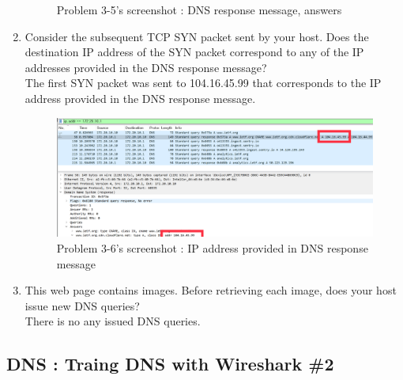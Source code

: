 \begin{enumerate}[label=\bfseries Problem \arabic*:,leftmargin=*,labelindent=1em]
\begin{figure}[!h]
        		\caption{\footnotesize Problem 3-5's screenshot : DNS response message, answers}
        		\vspace{-10pt}
            \end{figure}
        \item Consider the subsequent TCP SYN packet sent by your host.
        Does the destination IP address of the SYN packet correspond to any of the IP addresses 
        provided in the DNS response message?\\[0.2mm]
            \soln The first SYN packet was sent to 104.16.45.99 that corresponds to the IP address provided in the DNS response message.
            \vspace{-2mm}  
            \begin{figure}[!h]\centering
        		\includegraphics[width=.78\textwidth]{image/result_week01/Q3-6.png}
        		\caption{\footnotesize Problem 3-6's screenshot : IP address provided in DNS response message}
        		\vspace{-10pt}
            \end{figure}
        \item This web page contains images. Before retrieving each image, 
        does your host issue new DNS queries?\\[0.2mm]
            \soln There is no any issued DNS queries.
    \end{enumerate}
\clearpage
\subsection{DNS : Traing DNS with Wireshark \#2}
